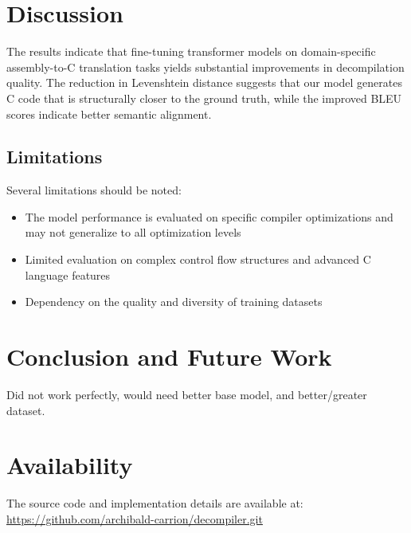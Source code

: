 \documentclass[conference]{IEEEtran}
\begin{document}
\section{Discussion}

The results indicate that fine-tuning transformer models on domain-specific assembly-to-C translation tasks yields substantial improvements in decompilation quality. The reduction in Levenshtein distance suggests that our model generates C code that is structurally closer to the ground truth, while the improved BLEU scores indicate better semantic alignment.

\subsection{Limitations}

Several limitations should be noted:
\begin{itemize}
\item The model performance is evaluated on specific compiler optimizations and may not generalize to all optimization levels
\item Limited evaluation on complex control flow structures and advanced C language features
\item Dependency on the quality and diversity of training datasets
\end{itemize}

\section{Conclusion and Future Work}

Did not work perfectly, would need better base model, and better/greater dataset.



\section{Availability}

The source code and implementation details are available at: \\
\url{https://github.com/archibald-carrion/decompiler.git}
\end{document}
